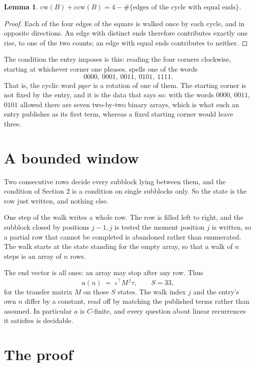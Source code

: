 \documentclass[11pt,a4paper]{article}
\theoremstyle{plain}
\newtheorem{lemma}[theorem]{Lemma}
\theoremstyle{definition}
\begin{document}
\begin{lemma}\label{lem:sum}
$\mathrm{cw}(B)+\mathrm{ccw}(B)=4-\#\{\text{edges of the cycle with equal ends}\}$.
\end{lemma}

\begin{proof}
Each of the four edges of the square is walked once by each cycle, and in opposite directions.
An edge with distinct ends therefore contributes exactly one rise, to one of the two counts;
an edge with equal ends contributes to neither.
\end{proof}

The condition the entry imposes is this: reading the four corners clockwise, starting at whichever corner one pleases, spells one of the words
\[
0000,\ 0001,\ 0011,\ 0101,\ 1111.
\]
That is, the cyclic word $pqsr$ is a rotation of one of them. The starting corner is not fixed by the entry, and it is the data that says so: with the words $0000$, $0011$, $0101$ allowed there are seven two-by-two binary arrays, which is what such an entry publishes as its first term, whereas a fixed starting corner would leave three.

\section{A bounded window}

Two consecutive rows decide every subblock lying between them, and the condition of Section 2 is a condition on single subblocks only. So the state is the row just written, and nothing else.

One step of the walk writes a whole row. The row is filled left to right, and the subblock
closed by positions $j-1,j$ is tested the moment position $j$ is written, so a partial row that
cannot be completed is abandoned rather than enumerated. The walk starts at the state standing
for the empty array, so that a walk of $n$ steps is an array of $n$ rows.

The end vector is all ones: an array may stop after any row. Thus
\[
a(n)\;=\;\iota^{\!\top}M^{\,j}\tau ,\qquad S=33,
\]
for the transfer matrix $M$ on those $S$ states. The walk index $j$ and the entry's own $n$
differ by a constant, read off by matching the published terms rather than assumed. In
particular $a$ is $C$-finite, and every question about linear recurrences it satisfies is
decidable.

\section{The proof}
\end{document}
